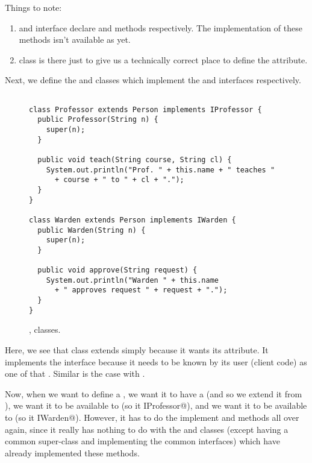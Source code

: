 \documentclass[12pt,a4paper]{article}
\begin{document}
Things to note:
\begin{enumerate}
	\item \lstinline@IProfessor@ and \lstinline@IWarden@ interface declare \lstinline@teach@ and \lstinline@approve@ methods respectively. The implementation of these methods isn't available as yet.
	\item \lstinline@Person@ class is there just to give us a technically correct place to define the \lstinline@name@ attribute.
\end{enumerate}

Next, we define the \lstinline@Professor@ and \lstinline@Warden@ classes which implement the \lstinline@IProfessor@ and \lstinline@IWarden@ interfaces respectively.

\begin{figure}[H]
\begin{lstlisting}[frame=single]

class Professor extends Person implements IProfessor {
  public Professor(String n) {
    super(n);
  }

  public void teach(String course, String cl) {
    System.out.println("Prof. " + this.name + " teaches "
      + course + " to " + cl + ".");
  }
}

class Warden extends Person implements IWarden {
  public Warden(String n) {
    super(n);
  }

  public void approve(String request) {
    System.out.println("Warden " + this.name
      + " approves request " + request + ".");
  }
}
\end{lstlisting}
\caption{\lstinline@Professor@, \lstinline@Warden@ classes.}
\label{f:mij2}
\end{figure}

Here, we see that \lstinline@Professor@ class extends \lstinline@Person@ simply because it wants its \lstinline@name@ attribute. It implements the \lstinline@IProfessor@ interface because it needs to be known by its user (client code) as one of \lstinline@IProfessor@ that \lstinline@teach@es. Similar is the case with \lstinline@Warden@.

Now, when we want to define a \lstinline@ProfessorWarden@, we want it to have a \lstinline@name@ (and so we extend it from \lstinline@Person@), we want it to be available to \lstinline@teach@ (so it \lstinline@implements IProfessor@), and we want it to be available to \lstinline@approve@ (so it \lstinline@implements IWarden@). However, it has to do the implement \lstinline@teach@ and \lstinline@approve@ methods all over again, since it really has nothing to do with the \lstinline@Person@ and \lstinline@Warden@ classes (except having a common super-class \lstinline@Person@ and implementing the common interfaces) which have already implemented these methods.
\end{document}
